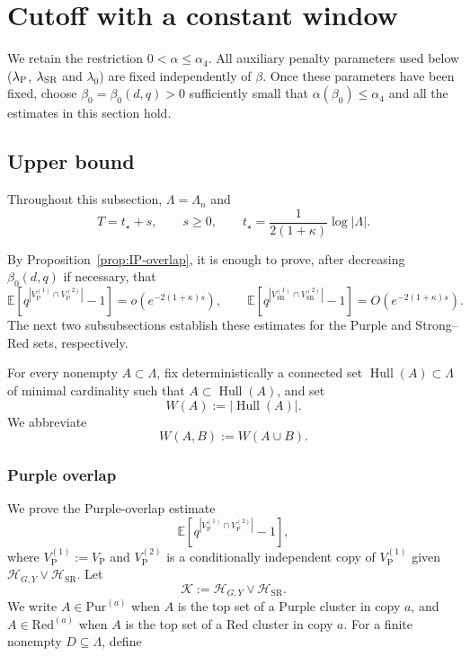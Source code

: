 \documentclass[letterpaper,11pt,reqno]{amsart}
\theoremstyle{definition}
\begin{document}
\medskip
\section{Cutoff with a constant window}\label{sec:cutoff}

We retain the restriction \(0<\alpha\le\alpha_4\). 
All auxiliary
penalty parameters used below (\(\lambda_{\rm P}\), \(\lambda_{\rm SR}\) and \(\lambda_0\)) are  fixed independently of \(\beta\). Once these parameters have been fixed, choose \(\beta_0=\beta_0(d,q)>0\)
sufficiently small that \(\alpha(\beta_0)\le\alpha_4\) and all the estimates in this section hold.

\subsection{Upper bound}\label{subsec:cutoff-upper}
Throughout this subsection, \(\Lambda=\Lambda_n\) and
\[
        T=t_\star+s,
        \qquad s\ge0,
        \qquad
        t_\star=\frac{1}{2(1+\kappa)}\log|\Lambda|.
\]

By Proposition~\ref{prop:IP-overlap}, it is enough to prove, after decreasing
\(\beta_0(d,q)\) if necessary, that
\[
\mathbb E\left[
q^{|V_{\mathrm P}^{(1)}\cap V_{\mathrm P}^{(2)}|}-1
\right]
=
o(e^{-2(1+\kappa)s}),
\qquad
\mathbb E\left[
q^{|V_{\mathrm{SR}}^{(1)}\cap V_{\mathrm{SR}}^{(2)}|}-1
\right]
=
O(e^{-2(1+\kappa)s}).
\]
The next two subsubsections establish these estimates for the Purple and
Strong--Red sets, respectively.




For every nonempty $A\subset\Lambda$, fix deterministically a connected set
$\operatorname{Hull}(A)\subset\Lambda$ of minimal cardinality such that
$A\subset\operatorname{Hull}(A)$, and set
\[
        W(A):=|\operatorname{Hull}(A)|.
\]
We abbreviate
\[
        W(A,B):=W(A\cup B).
\]

\subsubsection{Purple overlap} 
We prove the Purple-overlap estimate
\[
\mathbb E\left[
q^{|V_{\mathrm{P}}^{(1)}\cap V_{\mathrm{P}}^{(2)}|}-1
\right],
\]
where \(V_{\mathrm{P}}^{(1)}:=V_{\mathrm{P}}\) and \(V_{\mathrm{P}}^{(2)}\) is a conditionally independent copy of \(V_{\mathrm{P}}^{(1)}\) given
\(\mathcal H_{G,Y}\vee\mathcal H_{\mathrm{SR}}\).
Let
\[
        \mathcal K:=\mathcal H_{G,Y}\vee\mathcal H_{\mathrm{SR}} .
\]
We write $A\in\mathrm{Pur}^{(a)}$ when $A$ is the top set of a Purple cluster
in copy \(a\), and \(A\in\mathrm{Red}^{(a)}\) when \(A\) is the top set of a Red cluster in copy \(a\).
%
For a finite nonempty \(D\subseteq\Lambda\), define
\end{document}
